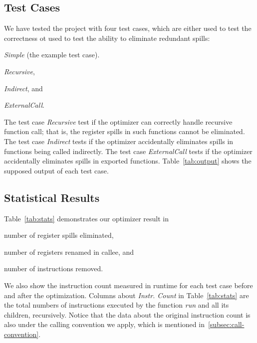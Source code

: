 \documentclass[acmsmall]{acmart}
\begin{document}
\subsection{Test Cases}
We have tested the project with four test cases, which are either used to test the correctness ot used to test the ability to eliminate redundant spills:
\begin{description}[labelwidth=4cm]
	\item[For elimination ability]
	\begin{enumerate*}
		\item \textit{Simple} (the example test case).
	\end{enumerate*}
	\item[For correctness]
	\begin{enumerate*}
		\item \textit{Recursive},
		\item \textit{Indirect}, and
		\item \textit{ExternalCall}.
	\end{enumerate*}
\end{description}
The test case \textit{Recursive} test if the optimizer can correctly handle recursive function call; that is, the register spills in such functions cannot be eliminated. The test case \textit{Indirect} tests if the optimizer accidentally eliminates spills in functions being called indirectly. The test case \textit{ExternalCall} tests if the optimizer accidentally eliminates spills in exported functions. Table~\ref{tab:output} shows the supposed output of each test case.

\subsection{Statistical Results}
Table~\ref{tab:stats} demonstrates our optimizer result in
\begin{enumerate*}
	\item number of register spills eliminated,
	\item number of registers renamed in callee, and
	\item number of instructions removed.
\end{enumerate*}
We also show the instruction count measured in runtime for each test case before and after the optimization. Columns about \textit{Instr. Count} in Table~\ref{tab:stats} are the total numbers of instructions executed by the function \textit{run} and all its children, recursively. Notice that the data about the original instruction count is also under the calling convention we apply, which is mentioned in~\ref{subsec:call-convention}.
\end{document}
